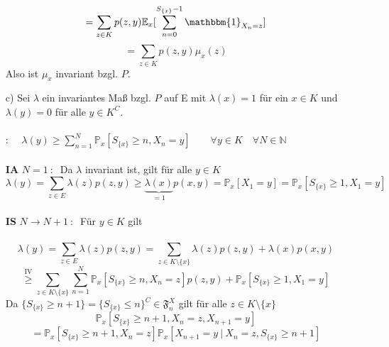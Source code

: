\begin{itemize}
\begin{equation*}
\end{equation*}
\begin{equation*}
= \sum_{z \in K} p(z,y)\mathbb{E}_{x}[\sum_{n=0}^{S_{\lbrace x \rbrace}-1}  \mathbbm{1}_{X_{n} = z}]
\end{equation*}
\begin{equation*}
= \sum_{z \in K} p(z,y) \mu_{x}(z)
\end{equation*}
Also ist $\mu_{x}$ invariant bzgl. $P$.
\item[c)] Sei $\lambda$ ein invariantes Maß bzgl. $P$ auf E mit $\lambda(x) = 1$ für ein $x \in K$ und $\lambda(y) = 0$ für alle $y \in K^{C}$.
\\
\\
: $\quad \lambda(y) \geq \sum_{n=1}^{N} \mathbb{P}_{x}[S_{\lbrace x \rbrace} \geq n, X_{n} = y] \qquad \forall y \in K \quad \forall N \in \mathbb{N}$
\\
\\
\textbf{IA} $N=1 \: : \: $ Da $\lambda$ invariant ist, gilt für alle $y \in K$
\begin{equation*}
\lambda(y) = \sum_{z \in E} \lambda(z)p(z,y) \geq \underbrace{\lambda(x)}_{=1}p(x,y) = \mathbb{P}_{x}[X_{1}=y] = \mathbb{P}_{x}[S_{\lbrace x \rbrace} \geq 1, X_{1} = y]
\end{equation*}
\\
\textbf{IS} $N \to N+1 \: : \: $ Für $y \in K$ gilt
\\
\\
\begin{equation*}
\lambda(y) = \sum_{z \in E} \lambda(z)p(z,y) = \sum_{z \in K \setminus \lbrace x \rbrace} \lambda(z)p(z,y) + \lambda(x)p(x,y)
\end{equation*}
\begin{equation*}
\stackrel{\mathrm{IV}}{\geq} \sum_{z \in K \setminus \lbrace x \rbrace} \sum_{n=1}^{N} \mathbb{P}_{x}[S_{\lbrace x \rbrace} \geq n, X_{n} = z]p(z,y) + \mathbb{P}_{x}[S_{\lbrace x \rbrace} \geq 1, X_{1} = y]
\end{equation*}
Da $\lbrace S_{\lbrace x \rbrace} \geq n + 1 \rbrace = {\lbrace S_{\lbrace x \rbrace} \leq n \rbrace}^{C} \in \mathfrak{F}^{X}_{n} $ gilt für alle $z \in K \setminus \lbrace x \rbrace$ 
\begin{equation*}
\mathbb{P}_{x}[S_{\lbrace x \rbrace} \geq n+1, X_{n} = z, X_{n+1} = y]
\end{equation*}
\begin{equation*}
= \mathbb{P}_{x}[S_{\lbrace x \rbrace} \geq n+1, X_{n} = z] \mathbb{P}_{x}[ X_{n+1} = y \: | \: X_{n} = z, S_{\lbrace x \rbrace} \geq n+1]

\end{equation*}
\end{itemize}
